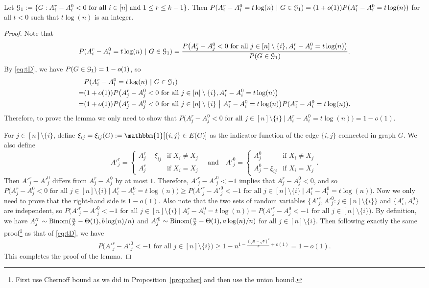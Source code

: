 \documentclass{article}
\begin{document}
\begin{lemma}  \label{lm:5t}
Let $\mathcal{G}_1:=\{G:A^r_i-A^0_i<0\text{~for all~}i\in[n]\text{~and~}1\leq r \leq k-1\}$. Then $P(A^r_i-A^0_i= t\log(n)~|~G\in\mathcal{G}_1)= (1+o(1))P(A^r_i-A^0_i= t\log(n))$ for all $t<0$ such that $t\log(n)$ is an integer.
\end{lemma}

\begin{proof}
Note that 
$$
P(A^r_i-A^0_i= t\log(n)~|~G\in\mathcal{G}_1)
=\frac{P \big(A^r_j-A^0_j<0\text{~for all~} j\in[n]\setminus\{i\}, A^r_i-A^0_i= t\log(n) \big)}{P(G\in\mathcal{G}_1)} .
$$
By \eqref{eq:tD}, we have $P(G\in\mathcal{G}_1)=1-o(1)$, so
\begin{align*}
& P(A^r_i-A^0_i= t\log(n)~|~G\in\mathcal{G}_1) \\
= & (1+o(1)) P \big(A^r_j-A^0_j<0\text{~for all~} j\in[n]\setminus\{i\}, A^r_i-A^0_i= t\log(n) \big) \\
= & (1+o(1)) P \big(A^r_j-A^0_j<0\text{~for all~} j\in[n]\setminus\{i\} ~\big|~ A^r_i-A^0_i= t\log(n) \big) P(A^r_i-A^0_i= t\log(n)) .
\end{align*}
Therefore, to prove the lemma we only need to show that $P \big(A^r_j-A^0_j<0\text{~for all~} j\in[n]\setminus\{i\} ~\big|~ A^r_i-A^0_i= t\log(n) \big)=1-o(1)$. 

For $j\in[n]\setminus\{i\}$, define $\xi_{ij}=\xi_{ij}(G):=\mathbbm{1}[\{i,j\}\in E(G)]$ as the indicator function of the edge $\{i,j\}$ connected in graph $G$. We also define 
$$
A'^r_j=\left\{
\begin{array}{cl}
  A^r_j-\xi_{ij}   & \mbox{if~} X_i\neq X_j \\
  A^r_j   &   \mbox{if~} X_i= X_j
\end{array}
\right.
\quad \text{and} \quad
A'^0_j=\left\{
\begin{array}{cl}
  A^0_j   & \mbox{if~} X_i\neq X_j \\
  A^0_j-\xi_{ij}   &   \mbox{if~} X_i= X_j
\end{array}
\right. .
$$
Then $A'^r_j-A'^0_j$ differs from $A^r_j-A^0_j$ by at most $1$.
Therefore, $A'^r_j-A'^0_j<-1$ implies that $A^r_j-A^0_j<0$,
and so $P \big(A^r_j-A^0_j<0\text{~for all~} j\in[n]\setminus\{i\} ~\big|~ A^r_i-A^0_i= t\log(n) \big) \ge P \big(A'^r_j-A'^0_j<-1 \text{~for all~} j\in[n]\setminus\{i\} ~\big|~ A^r_i-A^0_i= t\log(n) \big)$.
Now we only need to prove that the right-hand side is $1-o(1)$.
Also note that the two sets of random variables $\{A'^r_j,A'^0_j:j\in[n]\setminus\{i\}\}$ and $\{A^r_i,A^0_i\}$ are independent,
so $P \big(A'^r_j-A'^0_j<-1 \text{~for all~} j\in[n]\setminus\{i\} ~\big|~ A^r_i-A^0_i= t\log(n) \big)=P \big(A'^r_j-A^0_j<-1 \text{~for all~} j\in[n]\setminus\{i\}  \big)$.
By definition, we have
$A'^r_j\sim\operatorname{Binom}(\frac{n}{k}-\Theta(1),b\log(n)/n)$
and $A'^0_j\sim\operatorname{Binom}(\frac{n}{k}-\Theta(1),a\log(n)/n)$ for all $j\in[n]\setminus\{i\}$.
Then following exactly the same proof\footnote{First use Chernoff bound as we did in Proposition~\ref{prop:cher} and then use the union bound.} as that of \eqref{eq:tD}, we have
$$
P \big(A'^r_j-A'^0_j <-1 \text{~for all~} j\in[n]\setminus\{i\}  \big)
\ge 1- n^{1-\frac{(\sqrt{a}-\sqrt{b})^2}{k} +o(1)} = 1-o(1).
$$
This completes the proof of the lemma.
\end{proof}
\end{document}
